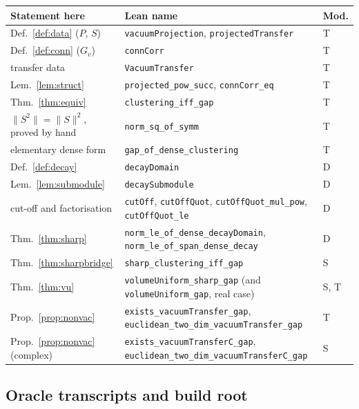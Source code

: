 \documentclass[11pt]{article}
\theoremstyle{definition}
\newcommand{\lean}[1]{\texttt{#1}}
\begin{document}
\small
\begin{longtable}{@{}>{\raggedright\arraybackslash}p{} >{\raggedright\arraybackslash}p{} l@{}}
\toprule
Statement here & Lean name & Mod. \\
\midrule
\endhead
Def.~\ref{def:data} ($P$, $S$) & \lean{vacuumProjection},
  \lean{projectedTransfer} & T \\
Def.~\ref{def:conn} ($G_v$) & \lean{connCorr} & T \\
transfer data & \lean{VacuumTransfer} & T \\
Lem.~\ref{lem:struct} & \lean{projected\_pow\_succ},
  \lean{connCorr\_eq} & T \\
Thm.~\ref{thm:equiv} & \lean{clustering\_iff\_gap} & T \\
$\|S^2\|=\|S\|^2$, proved by hand & \lean{norm\_sq\_of\_symm} & T \\
elementary dense form & \lean{gap\_of\_dense\_clustering} & T \\
Def.~\ref{def:decay} & \lean{decayDomain} & D \\
Lem.~\ref{lem:submodule} & \lean{decaySubmodule} & D \\
cut-off and factorisation & \lean{cutOff}, \lean{cutOffQuot},
  \lean{cutOffQuot\_mul\_pow}, \lean{cutOffQuot\_le} & D \\
Thm.~\ref{thm:sharp} & \lean{norm\_le\_of\_dense\_decayDomain},
  \lean{norm\_le\_of\_span\_dense\_decay} & D \\
Thm.~\ref{thm:sharpbridge} & \lean{sharp\_clustering\_iff\_gap} & S \\
Thm.~\ref{thm:vu} & \lean{volumeUniform\_sharp\_gap} (and
  \lean{volumeUniform\_gap}, real case) & S, T \\
Prop.~\ref{prop:nonvac} & \lean{exists\_vacuumTransfer\_gap},
  \lean{euclidean\_two\_dim\_vacuumTransfer\_gap} & T \\
Prop.~\ref{prop:nonvac} (complex) & \lean{exists\_vacuumTransferC\_gap},
  \lean{euclidean\_two\_dim\_vacuumTransferC\_gap} & S \\
\bottomrule
\end{longtable}
\normalsize

\subsection*{Oracle transcripts and build root}
\end{document}
